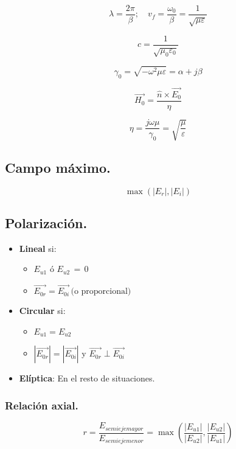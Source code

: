 \documentclass[12pt,a4paper]{article}
\begin{document}
\[ \lambda = \frac{2 \pi}{\beta}; \quad v_f = \frac{\omega_0}{\beta}  =
\frac{1}{\sqrt{\mu \varepsilon}} \]

\[ c = \frac{1}{\sqrt{\mu_0 \varepsilon_0}} \]

\[ \gamma_0 = \sqrt{-\omega^2 \mu \varepsilon} = \alpha + j \beta \]

\[ \vec{H_0} = \frac{\hat{n} \times \vec{E_0}}{\eta} \]

\[ \eta = \frac{j \omega \mu}{\gamma_0} = \sqrt{\frac{\mu}{\varepsilon}} \]

\subsection{Campo máximo.}

\[ \max{\left(|E_r|, |E_i|\right)} \]

\subsection{Polarización.}
\label{sub:polarizacion}

\begin{itemize}
		\item \textbf{Lineal} si:
				\begin{itemize}
						\item $ E_{u1} $ ó $ E_{u2} \, = \, 0$
                        \item $ \vec{E_{0r}} = \vec{E_{0i}} \, \mbox{(o
                            proporcional)} $ 
						
				\end{itemize}
		\item \textbf{Circular} si:
				\begin{itemize}
						\item $ E_{u1} = E_{u2} $ 
						\item $ |\vec{E_{0r}}| = |\vec{E_{0i}}| $ y $ \vec{E_{0r}} \perp \vec{E_{0i}} $ 
				\end{itemize}
		\item \textbf{Elíptica}:
				En el resto de situaciones.
\end{itemize}

\subsubsection{Relación axial.}
\label{ssub:relacion_axial}

\[ r = \frac{E_{semieje mayor}}{E_{semieje menor}} = \max{\left(
\frac{|E_{u1}|}{|E_{u2}|}, \frac{|E_{u2}|}{|E_{u1}|} \right)} \] 
\end{document}
